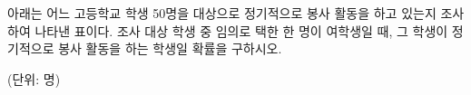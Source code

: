 아래는 어느 고등학교 학생 50명을 대상으로 정기적으로 봉사 활동을 하고 있는지 조사하여 나타낸 표이다. 조사 대상 학생 중 임의로 택한 한 명이 여학생일 때, 그 학생이 정기적으로 봉사 활동을 하는 학생일 확률을 구하시오.\par\noindent\hfill{\footnotesize (단위: 명)}\par\smallskip{}\par\smallskip\noindent
